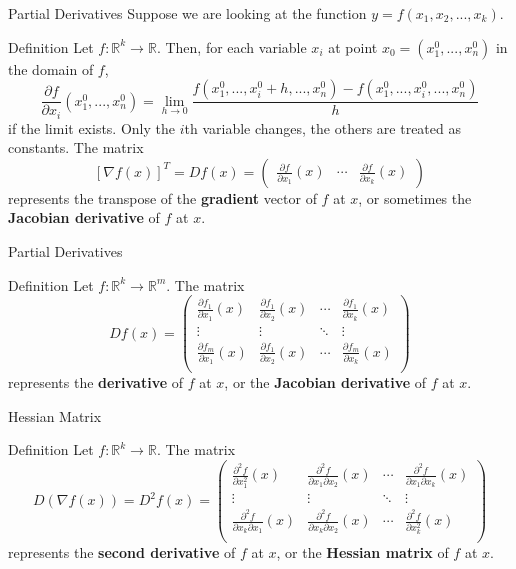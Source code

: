 \documentclass{beamer}
\begin{document}
\begin{frame}{Partial Derivatives}
Suppose we are looking at the function $y=f(x_1, x_2,..., x_k)$.
\begin{block}{Definition}
Let $f:\mathbb{R}^k\to \mathbb{R}$. Then, for each variable $x_i$ at point $x_0=(x_1^0,..., x_n^0)$ in the domain of $f$, 
\[\frac{\partial f}{\partial x_i} (x_1^0,..., x_n^0)=\lim_{h\to 0}\frac{f(x_1^0,..., x_i^0+h,..., x_n^0)-f(x_1^0,..., x_i^0,..., x_n^0) }{h}
\]
if the limit exists. Only the $i$th variable changes, the others are treated as constants. The matrix 
\[[\nabla f(x)]^T=Df(x)=\begin{pmatrix} \frac{\partial f}{\partial x_1}(x) & \cdots & \frac{\partial f}{\partial x_k}(x)\end{pmatrix}
\] represents the transpose of the \textbf{gradient} vector of $f$ at $x$, or sometimes the \textbf{Jacobian derivative} of $f$ at $x$.
\end{block}
    \end{frame}

\begin{frame}{Partial Derivatives}
\begin{block}{Definition}
Let $f:\mathbb{R}^k\to \mathbb{R}^m$. 
 The matrix 
\[Df(x)=\begin{pmatrix} \frac{\partial f_1}{\partial x_1}(x) & \frac{\partial f_1}{\partial x_2}(x)& \cdots & \frac{\partial f_1}{\partial x_k}(x)\\
\vdots & \vdots &\ddots & \vdots\\
 \frac{\partial f_m}{\partial x_1}(x) & \frac{\partial f_1}{\partial x_2}(x)& \cdots & \frac{\partial f_m}{\partial x_k}(x)\\
\end{pmatrix}
\] represents the \textbf{derivative}  of $f$ at $x$, or the \textbf{Jacobian derivative} of $f$ at $x$.
\end{block}
\end{frame}

\begin{frame}{Hessian Matrix}
\begin{block}{Definition}
Let $f:\mathbb{R}^k\to \mathbb{R}$. 
 The matrix 
\[D(\nabla f(x))=D^2f(x)=\begin{pmatrix} \frac{\partial^2 f}{\partial x_1^2}(x) & \frac{\partial^2 f}{\partial x_1\partial x_2}(x)& \cdots & \frac{\partial^2 f}{\partial x_1\partial x_k}(x)\\
\vdots & \vdots &\ddots & \vdots\\
 \frac{\partial^2 f}{\partial x_k\partial x_1}(x) & \frac{\partial^2 f}{\partial x_k \partial x_2}(x)& \cdots & \frac{\partial^2 f}{\partial x_k^2}(x)\\
\end{pmatrix}
\] represents the \textbf{ second derivative}  of $f$ at $x$, or the \textbf{Hessian matrix} of $f$ at $x$.
\end{block}
    
\end{frame}
\end{document}
